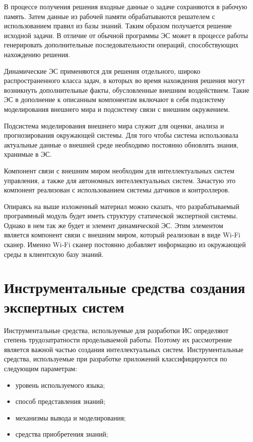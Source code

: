 В процессе получения решения входные данные о задаче сохраняются в рабочую память. Затем данные из рабочей памяти обрабатываются решателем с использованием правил из базы знаний. Таким образом получается решение исходной задачи. В отличие от обычной программы ЭС может в процессе работы генерировать дополнительные последовательности операций, способствующих нахождению решения.
    
Динамические ЭС применяются для решения отдельного, широко распространенного класса задач, в которых во время нахождения решения могут возникнуть дополнительные факты, обусловленные внешним воздействием. Такие ЭС в дополнение к описанным компонентам включают в себя подсистему моделирования внешнего мира и подсистему связи с внешним окружением.

Подсистема моделирования внешнего мира служит для оценки, анализа и прогнозирования окружающей системы. Для того чтобы система использовала актуальные данные о внешней среде необходимо постоянно обновлять знания, хранимые в ЭС.

Компонент связи с внешним миром необходим для интеллектуальных систем управления, а также для автономных интеллектуальных систем. Зачастую это компонент реализован с использованием системы датчиков и контроллеров.

Опираясь на выше изложенный материал можно сказать, что разрабатываемый программный модуль будет иметь структуру статической экспертной системы. Однако в нем так же будет и элемент динамической ЭС. Этим элементом является компонент связи с внешним миром, который реализован в виде Wi-Fi сканер. Именно Wi-Fi сканер постоянно добавляет информацию из окружающей среды в клиентскую базу знаний.

\section{Инструментальные средства создания экспертных систем}

Инструментальные средства, используемые для разработки ИС определяют степень трудозатратности проделываемой работы. Поэтому их рассмотрение является важной частью создания интеллектуальных систем. Инструментальные средства, используемые при разработке приложений классифицируются по следующим параметрам:

\begin{itemize}
\item уровень используемого языка;
\item способ представления знаний;
\item механизмы вывода и моделирования;
\item средства приобретения знаний;
\end{itemize}

